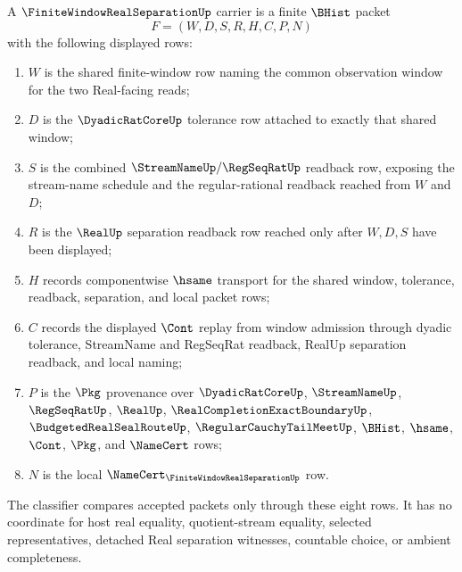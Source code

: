 \begin{definition}
\label{def:finite-window-real-separation-carrier}
A $\FiniteWindowRealSeparationUp$ carrier is a finite $\BHist$ packet
$$
F=(W,D,S,R,H,C,P,N)
$$
with the following displayed rows:
\begin{enumerate}
\item $W$ is the shared finite-window row naming the common observation window for the two Real-facing reads;
\item $D$ is the $\DyadicRatCoreUp$ tolerance row attached to exactly that shared window;
\item $S$ is the combined $\StreamNameUp/\RegSeqRatUp$ readback row, exposing the stream-name schedule and the regular-rational readback reached from $W$ and $D$;
\item $R$ is the $\RealUp$ separation readback row reached only after $W,D,S$ have been displayed;
\item $H$ records componentwise $\hsame$ transport for the shared window, tolerance, readback, separation, and local packet rows;
\item $C$ records the displayed $\Cont$ replay from window admission through dyadic tolerance, StreamName and RegSeqRat readback, RealUp separation readback, and local naming;
\item $P$ is the $\Pkg$ provenance over $\DyadicRatCoreUp$, $\StreamNameUp$, $\RegSeqRatUp$, $\RealUp$, $\RealCompletionExactBoundaryUp$, $\BudgetedRealSealRouteUp$, $\RegularCauchyTailMeetUp$, $\BHist$, $\hsame$, $\Cont$, $\Pkg$, and $\NameCert$ rows;
\item $N$ is the local $\NameCert_{\FiniteWindowRealSeparationUp}$ row.
\end{enumerate}
The classifier compares accepted packets only through these eight rows. It has no coordinate for host real equality, quotient-stream equality, selected representatives, detached Real separation witnesses, countable choice, or ambient completeness.
\end{definition}

